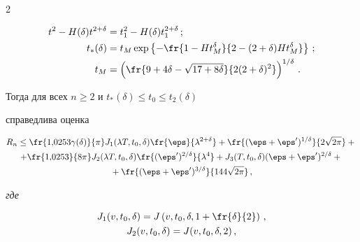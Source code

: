 \begin{multicols}{2}
{\begin{align*}


t^2-H(\delta)t^{2+\delta}&=t_1^2-H(\delta)t_1^{2+\delta}\,;


\\


t_*(\delta)&=


t_M\exp\left\{-\fr{1-Ht_M^{\delta}}{2-(2+\delta)Ht_M^{\delta}}\right\}\,;\\


t_M&=\left(\fr{9+4\delta -\sqrt{17+8\delta}}{2(2+\delta)^2}\right)^{1/\delta}\,.


\end{align*}


Тогда для всех $n\ge2$ и ${t_*(\delta)\le t_0\le t_2(\delta)}$


справедлива оценка}





\noindent


\begin{multline*}


R_n\le \fr{1{,}0253\gamma(\delta)}{\pi} J_1(\lambda T,t_0,\delta)


\fr{\eps}{\lambda^{2+\delta}} +


\fr{(\eps+\eps')^{1/\delta}}{2\sqrt{2\pi}}+{}\\


+ \fr{1{,}0253}{8\pi}J_2(\lambda T,t_0,\delta)


\fr{(\eps')^{2/\delta}}{\lambda^4}+ J_3(T,t_0,\delta) (\eps+\eps')^{2/\delta}+{}\\


{}+


\fr{(\eps+\eps')^{3/\delta}}{144\sqrt{2\pi}}\,,


\end{multline*}


\textit{где}


\begin{gather*}


J_1(v,t_0,\delta)=J\left(v,t_0,\delta,1+\fr{\delta}{2}\right)\,,\\


 J_2(v,t_0,\delta)= J(v,t_0,\delta,2)\,,


\end{gather*}





\vspace*{-12pt}






\end{multicols}
